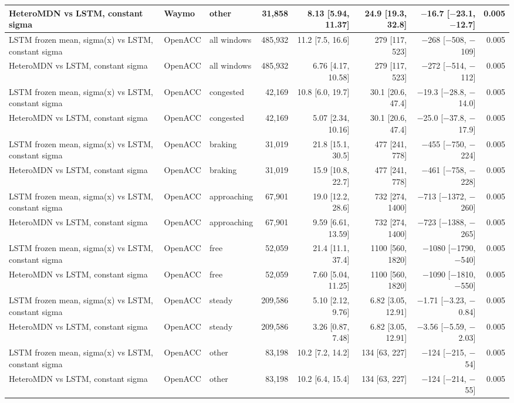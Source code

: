 \begin{longtable}{lllrrrrr}
HeteroMDN vs LSTM, constant sigma & Waymo & other & 31,858 & 8.13 [5.94, 11.37] & 24.9 [19.3, 32.8] & $-$16.7 [$-$23.1, $-$12.7] & 0.005 \\
\midrule
LSTM frozen mean, sigma(x) vs LSTM, constant sigma & OpenACC & all windows & 485,932 & 11.2 [7.5, 16.6] & 279 [117, 523] & $-$268 [$-$508, $-$109] & 0.005 \\
\midrule
HeteroMDN vs LSTM, constant sigma & OpenACC & all windows & 485,932 & 6.76 [4.17, 10.58] & 279 [117, 523] & $-$272 [$-$514, $-$112] & 0.005 \\
\midrule
LSTM frozen mean, sigma(x) vs LSTM, constant sigma & OpenACC & congested & 42,169 & 10.8 [6.0, 19.7] & 30.1 [20.6, 47.4] & $-$19.3 [$-$28.8, $-$14.0] & 0.005 \\
\midrule
HeteroMDN vs LSTM, constant sigma & OpenACC & congested & 42,169 & 5.07 [2.34, 10.16] & 30.1 [20.6, 47.4] & $-$25.0 [$-$37.8, $-$17.9] & 0.005 \\
\midrule
LSTM frozen mean, sigma(x) vs LSTM, constant sigma & OpenACC & braking & 31,019 & 21.8 [15.1, 30.5] & 477 [241, 778] & $-$455 [$-$750, $-$224] & 0.005 \\
\midrule
HeteroMDN vs LSTM, constant sigma & OpenACC & braking & 31,019 & 15.9 [10.8, 22.7] & 477 [241, 778] & $-$461 [$-$758, $-$228] & 0.005 \\
\midrule
LSTM frozen mean, sigma(x) vs LSTM, constant sigma & OpenACC & approaching & 67,901 & 19.0 [12.2, 28.6] & 732 [274, 1400] & $-$713 [$-$1372, $-$260] & 0.005 \\
\midrule
HeteroMDN vs LSTM, constant sigma & OpenACC & approaching & 67,901 & 9.59 [6.61, 13.59] & 732 [274, 1400] & $-$723 [$-$1388, $-$265] & 0.005 \\
\midrule
LSTM frozen mean, sigma(x) vs LSTM, constant sigma & OpenACC & free & 52,059 & 21.4 [11.1, 37.4] & 1100 [560, 1820] & $-$1080 [$-$1790, $-$540] & 0.005 \\
\midrule
HeteroMDN vs LSTM, constant sigma & OpenACC & free & 52,059 & 7.60 [5.04, 11.25] & 1100 [560, 1820] & $-$1090 [$-$1810, $-$550] & 0.005 \\
\midrule
LSTM frozen mean, sigma(x) vs LSTM, constant sigma & OpenACC & steady & 209,586 & 5.10 [2.12, 9.76] & 6.82 [3.05, 12.91] & $-$1.71 [$-$3.23, $-$0.84] & 0.005 \\
\midrule
HeteroMDN vs LSTM, constant sigma & OpenACC & steady & 209,586 & 3.26 [0.87, 7.48] & 6.82 [3.05, 12.91] & $-$3.56 [$-$5.59, $-$2.03] & 0.005 \\
\midrule
LSTM frozen mean, sigma(x) vs LSTM, constant sigma & OpenACC & other & 83,198 & 10.2 [7.2, 14.2] & 134 [63, 227] & $-$124 [$-$215, $-$54] & 0.005 \\
\midrule
HeteroMDN vs LSTM, constant sigma & OpenACC & other & 83,198 & 10.2 [6.4, 15.4] & 134 [63, 227] & $-$124 [$-$214, $-$55] & 0.005 \\
\end{longtable}
\endgroup
